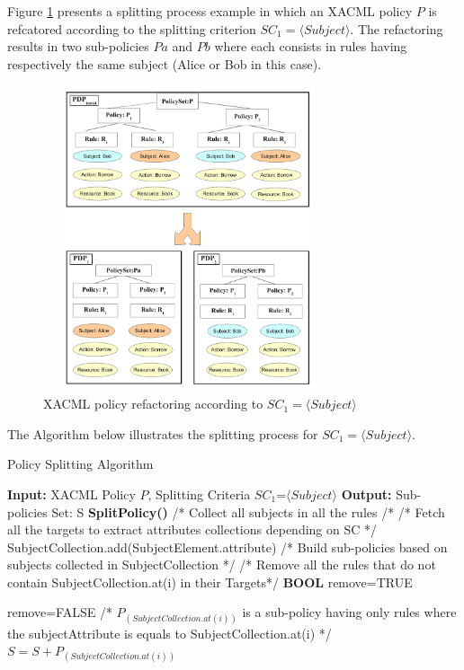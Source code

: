 Figure \ref{splitting} presents a splitting process example in which an XACML policy $P$ is refcatored according to
 the splitting criterion $SC_{1}=\langle Subject\rangle$. The refactoring results in two sub-policies $Pa$ and $Pb$ where
each consists in rules having respectively the same subject (Alice or Bob in this case).

\begin{figure}[!h]
\begin{center}
\includegraphics[width=8.5cm, height=9cm]{splitting}
\caption{XACML policy refactoring according to $SC_{1}=\langle Subject\rangle$}
\label{splitting}
\end{center}
\end{figure}

The Algorithm below illustrates the splitting process for $SC_{1}=\langle Subject\rangle$.
\begin{algorithmic}
\begin{algorithm}[!h]
\caption{Policy Splitting Algorithm}
\STATE \textbf{Input:} XACML Policy $P$, Splitting Criteria $SC_{1}$=$\langle Subject \rangle$
\STATE \textbf{Output:} Sub-policies Set: S
\STATE \textbf{SplitPolicy()}
\STATE /* Collect all subjects in all the rules /*
\STATE /* Fetch all the targets to extract attributes collections depending on SC */
\STATE SubjectCollection.add(SubjectElement.attribute)
\ENDIF
\ENDFOR
\ENDFOR
\STATE /* Build sub-policies based on subjects collected in SubjectCollection */
\STATE /* Remove all the rules that do not contain SubjectCollection.at(i) in their Targets*/
\STATE  \textbf{BOOL} remove=TRUE


\STATE remove=FALSE
\ENDIF
\ENDFOR
{}   \ENDIF
\ENDFOR
\STATE /* $P_{(SubjectCollection.at(i))}$ is a sub-policy having only rules where the subjectAttribute is equals to SubjectCollection.at(i) */
\STATE $S=S+P_{(SubjectCollection.at(i))}$
\ENDFOR
\end{algorithm}
\end{algorithmic}



